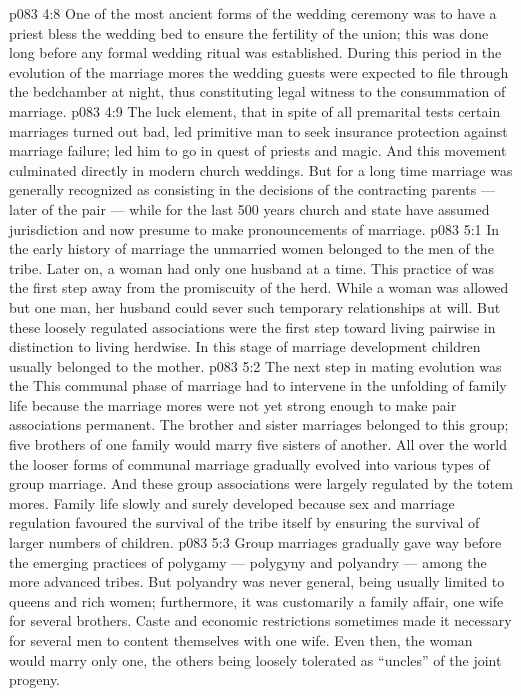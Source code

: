 \vs p083 4:8 One of the most ancient forms of the wedding ceremony was to have a priest bless the wedding bed to ensure the fertility of the union; this was done long before any formal wedding ritual was established. During this period in the evolution of the marriage mores the wedding guests were expected to file through the bedchamber at night, thus constituting legal witness to the consummation of marriage.
\vs p083 4:9 The luck element, that in spite of all premarital tests certain marriages turned out bad, led primitive man to seek insurance protection against marriage failure; led him to go in quest of priests and magic. And this movement culminated directly in modern church weddings. But for a long time marriage was generally recognized as consisting in the decisions of the contracting parents --- later of the pair --- while for the last 500 years church and state have assumed jurisdiction and now presume to make pronouncements of marriage.
\vs p083 5:1 In the early history of marriage the unmarried women belonged to the men of the tribe. Later on, a woman had only one husband at a time. This practice of  was the first step away from the promiscuity of the herd. While a woman was allowed but one man, her husband could sever such temporary relationships at will. But these loosely regulated associations were the first step toward living pairwise in distinction to living herdwise. In this stage of marriage development children usually belonged to the mother.
\vs p083 5:2 The next step in mating evolution was the  This communal phase of marriage had to intervene in the unfolding of family life because the marriage mores were not yet strong enough to make pair associations permanent. The brother and sister marriages belonged to this group; five brothers of one family would marry five sisters of another. All over the world the looser forms of communal marriage gradually evolved into various types of group marriage. And these group associations were largely regulated by the totem mores. Family life slowly and surely developed because sex and marriage regulation favoured the survival of the tribe itself by ensuring the survival of larger numbers of children.
\vs p083 5:3 Group marriages gradually gave way before the emerging practices of polygamy --- polygyny and polyandry --- among the more advanced tribes. But polyandry was never general, being usually limited to queens and rich women; furthermore, it was customarily a family affair, one wife for several brothers. Caste and economic restrictions sometimes made it necessary for several men to content themselves with one wife. Even then, the woman would marry only one, the others being loosely tolerated as “uncles” of the joint progeny.
